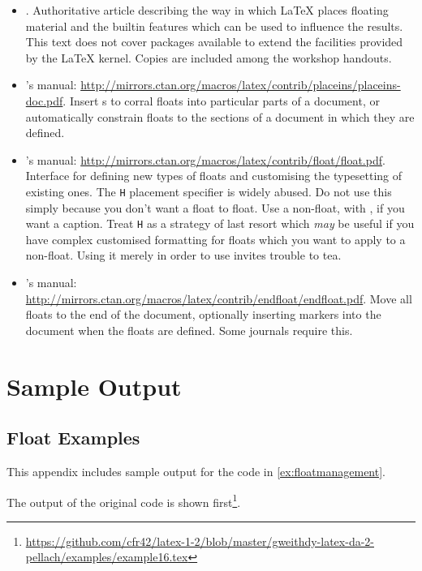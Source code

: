 \begin{itemize}
  \item {}.
  Authoritative article describing the way in which \LaTeX{} places floating material and the builtin features which can be used to influence the results.
  This text does not cover packages available to extend the facilities provided by the \LaTeX{} kernel.
  Copies are included among the workshop handouts.
  \item {}'s manual: \url{http://mirrors.ctan.org/macros/latex/contrib/placeins/placeins-doc.pdf}.
  Insert s to corral floats into particular parts of a document, or automatically constrain floats to the sections of a document in which they are defined.
  \item {}'s manual: \url{http://mirrors.ctan.org/macros/latex/contrib/float/float.pdf}.
  Interface for defining new types of floats and customising the typesetting of existing ones.
  The \verb|H| placement specifier is widely abused.
  Do not use this simply because you don't want a float to float.
  Use a non-float, with , if you want a caption.
  Treat \verb|H| as a strategy of last resort which \emph{may} be useful if you have complex customised formatting for floats which you want to apply to a non-float.
  Using it merely in order to use  invites trouble to tea.
  \item {}'s manual: \url{http://mirrors.ctan.org/macros/latex/contrib/endfloat/endfloat.pdf}.
  Move all floats to the end of the document, optionally inserting markers into the document when the floats are defined.
  Some journals require this.
\end{itemize}


\section<1-| beamer:0>{Sample Output}\label{sec:samples}

\subsection<1-| beamer:0>{Float Examples}\label{subsec:samples-floats}
This appendix includes sample output for the code in \cref{ex:floatmanagement}.

The output of the original code is shown first\footnote{\url{https://github.com/cfr42/latex-1-2/blob/master/gweithdy-latex-da-2-pellach/examples/example16.tex}}.

